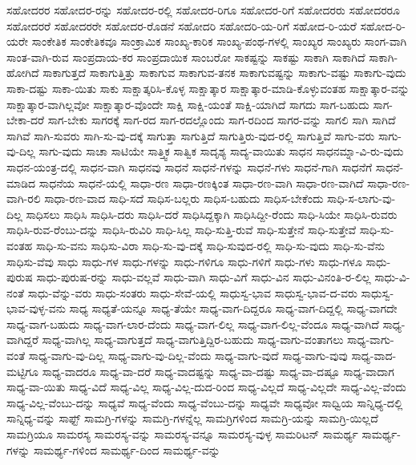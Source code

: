 {ಸಹೋದರರ
ಸಹೋದರ-ರನ್ನು
ಸಹೋದರ-ರಲ್ಲಿ
ಸಹೋದರ-ರಿಗೂ
ಸಹೋದರ-ರಿಗೆ
ಸಹೋದರರು
ಸಹೋದರರೂ
ಸಹೋದರರೆ
ಸಹೋದರರೇ
ಸಹೋದರ-ರೊಡನೆ
ಸಹೋದರಿ
ಸಹೋದರಿ-ಯ-ರಿಗೆ
ಸಹೋದ-ರಿ-ಯರೆ
ಸಹೋದ-ರಿ-ಯರೇ
ಸಾಂಕೇತಿಕ
ಸಾಂಕೇತಿಕವೂ
ಸಾಂಕ್ರಾಮಿಕ
ಸಾಂಖ್ಯ-ಕಾರಿಕ
ಸಾಂಖ್ಯ-ಪಂಥ-ಗಳಲ್ಲಿ
ಸಾಂಖ್ಯರ
ಸಾಂಖ್ಯರು
ಸಾಂಗ-ವಾಗಿ
ಸಾಂತ-ವಾಗಿ-ರುವ
ಸಾಂಪ್ರದಾಯ-ಕರ
ಸಾಂಪ್ರದಾಯಿಕ
ಸಾಂಬರೋ
ಸಾಕಷ್ಟನ್ನು
ಸಾಕಷ್ಟು
ಸಾಕಾಗಿ
ಸಾಕಾಗಿದೆ
ಸಾಕಾಗಿ-ಹೋಗಿದೆ
ಸಾಕಾಗುತ್ತದೆ
ಸಾಕಾಗುತ್ತಿತ್ತು
ಸಾಕಾಗುವ
ಸಾಕಾಗುವ-ತನಕ
ಸಾಕಾಗುವಷ್ಟನ್ನು
ಸಾಕಾಗು-ವಷ್ಟು
ಸಾಕಾಗು-ವುದು
ಸಾಕಾ-ದಷ್ಟು
ಸಾಕಾ-ಯಿತು
ಸಾಕು
ಸಾಕ್ಷಾತ್ಕರಿಸಿ-ಕೊಳ್ಳ
ಸಾಕ್ಷಾತ್ಕಾರ
ಸಾಕ್ಷಾತ್ಕಾರ-ಮಾಡಿ-ಕೊಳ್ಳುವಂತಹ
ಸಾಕ್ಷಾತ್ಕಾರ-ವನ್ನು
ಸಾಕ್ಷಾತ್ಕಾರ-ವಾಗಿಲ್ಲವೋ
ಸಾಕ್ಷಾತ್ಕಾರ-ವೊಂದೇ
ಸಾಕ್ಷಿ
ಸಾಕ್ಷಿ-ಯಂತೆ
ಸಾಕ್ಷಿ-ಯಾಗಿದೆ
ಸಾಗದು
ಸಾಗ-ಬಹುದು
ಸಾಗ-ಬೇಕಾ-ದರೆ
ಸಾಗ-ಬೇಕು
ಸಾಗರಕ್ಕೆ
ಸಾಗ-ರದ
ಸಾಗ-ರದಲ್ಲೊಂದು
ಸಾಗ-ರದಿಂದ
ಸಾಗರ-ವನ್ನು
ಸಾಗಲಿ
ಸಾಗಿ
ಸಾಗಿದೆ
ಸಾಗಿವೆ
ಸಾಗಿ-ಸುವರು
ಸಾಗಿ-ಸು-ವು-ದಕ್ಕೆ
ಸಾಗುತ್ತಾ
ಸಾಗುತ್ತಿದೆ
ಸಾಗುತ್ತಿರು-ವುದ-ರಲ್ಲಿ
ಸಾಗುತ್ತಿವೆ
ಸಾಗು-ವರು
ಸಾಗು-ವು-ದಿಲ್ಲ
ಸಾಗು-ವುದು
ಸಾಚಾ
ಸಾಟಿಯೇ
ಸಾತ್ತ್ವಿಕ
ಸಾತ್ವಿಕ
ಸಾದೃಶ್ಯ
ಸಾದ್ಯ-ವಾಯಿತು
ಸಾಧನ
ಸಾಧನಮ್ನಾ-ವಿ-ರು-ವುದು
ಸಾಧನ-ಯಂತ್ರ-ದಲ್ಲಿ
ಸಾಧನ-ವಾಗಿ
ಸಾಧನವು
ಸಾಧನೆ
ಸಾಧನೆ-ಗಳನ್ನು
ಸಾಧನೆ-ಗಳು
ಸಾಧನೆ-ಗಾಗಿ
ಸಾಧನೆಗೆ
ಸಾಧನೆ-ಮಾಡಿದ
ಸಾಧನೆಯ
ಸಾಧನೆ-ಯಲ್ಲಿ
ಸಾಧಾ-ರಣ
ಸಾಧಾ-ರಣಕ್ಕಿಂತ
ಸಾಧಾ-ರಣ-ವಾಗಿ
ಸಾಧಾ-ರಣ-ವಾಗಿದೆ
ಸಾಧಾ-ರಣ-ವಾಗಿ-ರಲಿ
ಸಾಧಾ-ರಣ-ವಾದ
ಸಾಧಿ-ಸದೆ
ಸಾಧಿಸ-ಬಲ್ಲರು
ಸಾಧಿಸ-ಬಹುದು
ಸಾಧಿಸ-ಬೇಕೆಂದು
ಸಾಧಿ-ಸ-ಲಾಗು-ವು-ದಿಲ್ಲ
ಸಾಧಿಸಲು
ಸಾಧಿಸಿ
ಸಾಧಿಸಿ-ದರು
ಸಾಧಿಸಿ-ದರೆ
ಸಾಧಿಸಿದ್ದಕ್ಕಾಗಿ
ಸಾಧಿಸಿದ್ದೀ-ರೆಂದು
ಸಾಧಿ-ಸಿಯೇ
ಸಾಧಿಸಿ-ರುವರು
ಸಾಧಿಸಿ-ರುವ-ರೆಂಬು-ದನ್ನು
ಸಾಧಿಸಿ-ರುವಿರಿ
ಸಾಧಿ-ಸಿಲ್ಲ
ಸಾಧಿ-ಸುತ್ತಿ-ರುವೆ
ಸಾಧಿ-ಸುತ್ತೇನೆ
ಸಾಧಿ-ಸುತ್ತೇವೆ
ಸಾಧಿ-ಸು-ವಂತಹ
ಸಾಧಿ-ಸು-ವನು
ಸಾಧಿಸು-ವಿರಾ
ಸಾಧಿ-ಸು-ವು-ದಕ್ಕೆ
ಸಾಧಿ-ಸುವುದ-ರಲ್ಲಿ
ಸಾಧಿ-ಸು-ವುದು
ಸಾಧಿ-ಸು-ವೆನು
ಸಾಧಿಸು-ವೆವು
ಸಾಧು
ಸಾಧು-ಗಳ
ಸಾಧು-ಗಳನ್ನು
ಸಾಧು-ಗಳಿಗೂ
ಸಾಧು-ಗಳಿಗೆ
ಸಾಧು-ಗಳು
ಸಾಧು-ಗಳೂ
ಸಾಧು-ಪುರುಷ
ಸಾಧು-ಪುರುಷ-ರನ್ನು
ಸಾಧು-ವಲ್ಲವೆ
ಸಾಧು-ವಾಗಿ
ಸಾಧು-ವಿಗೆ
ಸಾಧು-ವಿನ
ಸಾಧು-ವಿನಂತಿ-ರ-ಲಿಲ್ಲ
ಸಾಧು-ವಿ-ನಂತೆ
ಸಾಧು-ವೆನ್ನು-ವರು
ಸಾಧು-ಸಂತರು
ಸಾಧು-ಸೇವೆ-ಯಲ್ಲಿ
ಸಾಧುಸ್ವ-ಭಾವ
ಸಾಧುಸ್ವ-ಭಾವ-ದ-ವರು
ಸಾಧುಸ್ವ-ಭಾವ-ವುಳ್ಳ-ವನು
ಸಾಧ್ಯ
ಸಾಧ್ಯತೆ-ಯನ್ನೂ
ಸಾಧ್ಯ-ತೆಯೇ
ಸಾಧ್ಯ-ವಾಗ-ದಿದ್ದರೂ
ಸಾಧ್ಯ-ವಾಗ-ದಿದ್ದಲ್ಲಿ
ಸಾಧ್ಯ-ವಾಗದೇ
ಸಾಧ್ಯ-ವಾಗ-ಬಹುದು
ಸಾಧ್ಯ-ವಾಗ-ಲಾರ-ದೆಂದು
ಸಾಧ್ಯ-ವಾಗ-ಲಿಲ್ಲ
ಸಾಧ್ಯ-ವಾಗ-ಲಿಲ್ಲ-ವೆಂದೂ
ಸಾಧ್ಯ-ವಾಗಿದೆ
ಸಾಧ್ಯ-ವಾಗಿದ್ದರೆ
ಸಾಧ್ಯ-ವಾಗಿಲ್ಲ
ಸಾಧ್ಯ-ವಾಗುತ್ತದೆ
ಸಾಧ್ಯ-ವಾಗುತ್ತಿದ್ದಿರ-ಬಹುದು
ಸಾಧ್ಯ-ವಾಗು-ವಂತಾಗಲು
ಸಾಧ್ಯ-ವಾಗು-ವಂತೆ
ಸಾಧ್ಯ-ವಾಗು-ವು-ದಿಲ್ಲ
ಸಾಧ್ಯ-ವಾಗು-ವು-ದಿಲ್ಲ-ವೆಂದು
ಸಾಧ್ಯ-ವಾಗು-ವುದೆ
ಸಾಧ್ಯ-ವಾಗು-ವುವು
ಸಾಧ್ಯ-ವಾದ-ಮಟ್ಟಿಗೂ
ಸಾಧ್ಯ-ವಾದರೂ
ಸಾಧ್ಯ-ವಾ-ದರೆ
ಸಾಧ್ಯ-ವಾದಷ್ಟನ್ನು
ಸಾಧ್ಯ-ವಾ-ದಷ್ಟು
ಸಾಧ್ಯ-ವಾ-ದಷ್ಟೂ
ಸಾಧ್ಯ-ವಾದಾಗ
ಸಾಧ್ಯ-ವಾ-ಯಿತು
ಸಾಧ್ಯ-ವಿದೆ
ಸಾಧ್ಯ-ವಿಲ್ಲ
ಸಾಧ್ಯ-ವಿಲ್ಲ-ದುದ-ರಿಂದ
ಸಾಧ್ಯ-ವಿಲ್ಲದೆ
ಸಾಧ್ಯ-ವಿಲ್ಲದೇ
ಸಾಧ್ಯ-ವಿಲ್ಲ-ವೆಂದು
ಸಾಧ್ಯ-ವಿಲ್ಲ-ವೆಂಬು-ದನ್ನು
ಸಾಧ್ಯವೆ
ಸಾಧ್ಯ-ವೆಂದು
ಸಾಧ್ಯ-ವೆಂಬು-ದನ್ನು
ಸಾಧ್ಯವೇ
ಸಾಧ್ಯವೋ
ಸಾಧ್ವಿಯ
ಸಾನ್ನಿಧ್ಯ-ದಲ್ಲಿ
ಸಾನ್ನಿಧ್ಯ-ವನ್ನು
ಸಾಫ್ಟ್
ಸಾಮಗ್ರಿ-ಗಳನ್ನು
ಸಾಮಗ್ರಿ-ಗಳನ್ನೆಲ್ಲ
ಸಾಮಗ್ರಿಗಳಿಂದ
ಸಾಮಗ್ರಿ-ಯನ್ನು
ಸಾಮಗ್ರಿ-ಯಿಲ್ಲದೆ
ಸಾಮಗ್ರಿಯೂ
ಸಾಮರಸ್ಯ
ಸಾಮರಸ್ಯ-ವನ್ನು
ಸಾಮರಸ್ಯ-ವನ್ನೂ
ಸಾಮರಸ್ಯ-ವುಳ್ಳ
ಸಾಮರಿಟನ್
ಸಾಮರ್ಥ್ಯ
ಸಾಮರ್ಥ್ಯ-ಗಳನ್ನು
ಸಾಮರ್ಥ್ಯ-ಗಳಿಂದ
ಸಾಮರ್ಥ್ಯ-ದಿಂದ
ಸಾಮರ್ಥ್ಯ-ವನ್ನು
}
